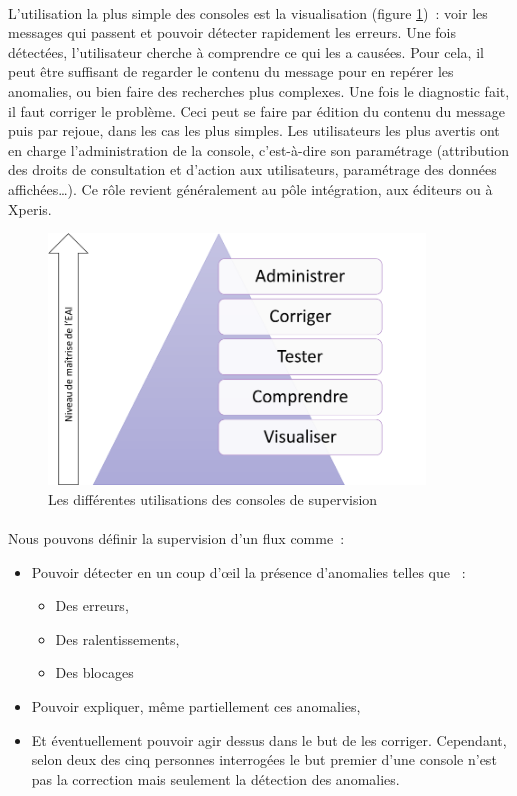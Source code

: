 			\paragraph{}
			L’utilisation la plus simple des consoles est la visualisation (figure
			\ref{usage_consoles})~: voir les messages qui passent et pouvoir détecter
			rapidement les erreurs. Une fois détectées, l’utilisateur cherche à
			comprendre ce qui les a causées. Pour cela, il peut être suffisant de
			regarder le contenu du message pour en repérer les anomalies, ou bien faire
			des recherches plus complexes.
			Une fois le diagnostic fait, il faut corriger le problème. Ceci peut se
			faire par édition du contenu du message puis par rejoue, dans les cas les
			plus simples.\newline
			Les utilisateurs les plus
			avertis ont en charge l’administration de la console, c’est-à-dire son
			paramétrage (attribution des droits de consultation et d’action aux
			utilisateurs, paramétrage des données affichées\ldots). Ce rôle revient
			généralement au pôle intégration, aux éditeurs ou à Xperis.
			\begin{figure}[H]
				\centering
				\includegraphics[width=10cm]{../img/usage_1.png}
				\caption{\label{usage_consoles} Les différentes utilisations des consoles
				de supervision}
			\end{figure}
			
			\paragraph{}
			Nous pouvons définir la supervision d'un flux comme~:
			\begin{itemize}
			  \item Pouvoir détecter en un coup d’œil la présence d’anomalies telles que
			 ~:
			  	\begin{itemize}
			  	  \item Des erreurs,
			  	  \item Des ralentissements,
			  	  \item Des blocages
		  	    \end{itemize}
			  \item Pouvoir expliquer, même partiellement ces anomalies,
			  \item Et éventuellement pouvoir agir dessus dans le but de les corriger.
			  Cependant, selon deux des cinq personnes interrogées le but premier d'une
			  console n'est pas la correction mais seulement la détection des anomalies. 
			\end{itemize}
			
